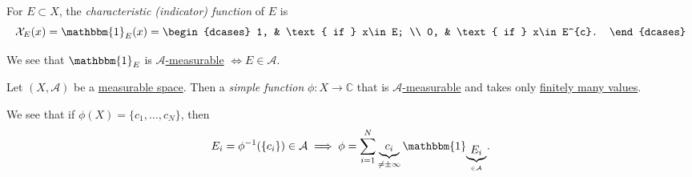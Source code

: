 \begin{definition}\label{def:characteristic-function}
	For \(E\subset X\), the \emph{characteristic (indicator) function} of \(E\) is
	\[
		\mathcal{X} _E (x)= \mathbbm{1}_{E}(x) = \begin{dcases}
			1, & \text{ if }  x\in E;     \\
			0, & \text{ if }  x\in E^{c}.
		\end{dcases}
	\]
\end{definition}
\begin{remark}
	We see that \(\mathbbm{1}_{ E}\) is \hyperref[def:A-measurable-function]{\(\mathcal{A}\)-measurable} \(\iff E\in\mathcal{A}\).
\end{remark}

\begin{definition}\label{def:simple-function}
	Let \((X, \mathcal{A} )\) be a \hyperref[def:measurable-space]{measurable space}. Then a \emph{simple function} \(\phi \colon X\to \mathbb{C} \) that
	is \hyperref[def:A-measurable-function]{\(\mathcal{A} \)-measurable} and takes only \underline{finitely many values}.
\end{definition}
\begin{remark}
	We see that if \(\phi (X) = \{c_1, \ldots , c_N \}\), then
	\[
		E_{i}= \phi ^{-1} (\{c_{i}\})\in \mathcal{A} \implies \phi = \sum\limits_{i=1}^{N} \underbrace{c_{i}}_{\neq \pm \infty }\mathbbm{1}_{\underbrace{E_{i}}_{\in \mathcal{A}}}.
	\]
\end{remark}